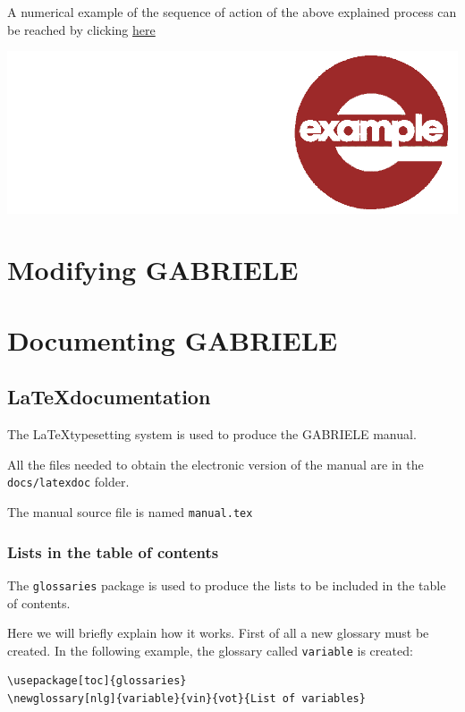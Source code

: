 \documentclass{book}
\newcommand{\umllocation}{file:///Users/giulioni/Dropbox/svn/sfcabm_my/documentation}
\begin{document}
\vskip1cm
A numerical example of the sequence of action of the above explained process can be reached by clicking \href{\umllocation/example_firm_good_conditions.html}{here}
\begin{marginfigure}
\hskip8mm	\includegraphics[scale=0.07]{example.png}
\end{marginfigure}



\part{Modifying GABRIELE}

\part{Documenting GABRIELE}


\chapter{\LaTeX documentation}
The \LaTeX typesetting system is used to produce the GABRIELE manual.

All the files needed to obtain the electronic version of the manual are in the \verb+docs/latexdoc+ folder.

The manual source file is named \verb+manual.tex+

\section{Lists in the table of contents}
The \verb+glossaries+ package is used to produce the lists to be included in the table of contents.

Here we will briefly explain how it works. First of all a new glossary must be created. In the following example, the glossary called \verb+variable+ is created: 

\begin{verbatim}
\usepackage[toc]{glossaries}
\newglossary[nlg]{variable}{vin}{vot}{List of variables}
\end{verbatim}
\end{document}
